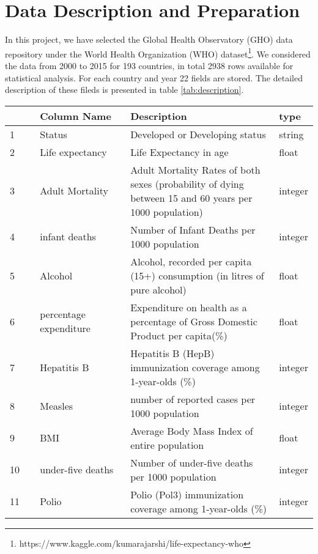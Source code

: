 \section{Data Description and Preparation}
\label{sec:data-preparation}

In this project, we have selected the Global Health Observatory (GHO) data repository under the World Health Organization (WHO) dataset\footnote{https://www.kaggle.com/kumarajarshi/life-expectancy-who}. We considered the data from 2000 to 2015 for 193 countries, in total 2938 rows available for statistical analysis. For each country and year 22 fields are stored. The detailed description of these fileds is presented in table \ref{tab:description}.

\begin{table}
  \centering
  \begin{tabular}{p{0.1\linewidth} | p{0.3\linewidth}p{0.5\linewidth}p{0.1\linewidth}}
      & Column Name     & Description                                                             & type \\
    \hline
    1 & Status                 & Developed or Developing status                               & string \\
    2 & Life expectancy   & Life Expectancy in age                                             & float \\
    3 & Adult Mortality    & Adult Mortality Rates of both sexes (probability of dying between 15 and 60 years per 1000 population) & integer \\
    4 & infant deaths      & Number of Infant Deaths per 1000 population & integer \\
    5 & Alcohol              & Alcohol, recorded per capita (15+) consumption (in litres of pure alcohol) & float \\
    6 & percentage expenditure & Expenditure on health as a percentage of Gross Domestic Product per capita(\%) & float \\
    7 & Hepatitis B & Hepatitis B (HepB) immunization coverage among 1-year-olds (\%) & integer \\
    8 & Measles & number of reported cases per 1000 population & integer \\
    9 & BMI & Average Body Mass Index of entire population & float \\
    10 & under-five deaths & Number of under-five deaths per 1000 population & integer \\
    11 & Polio & Polio (Pol3) immunization coverage among 1-year-olds (\%) & integer \\

\end{tabular}
\end{table}
